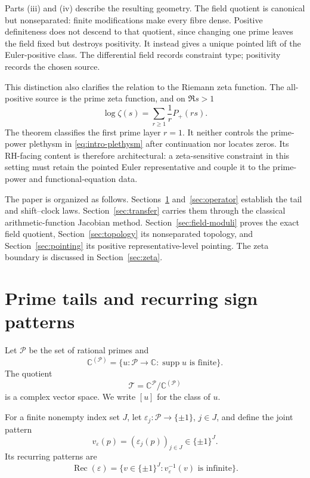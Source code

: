 \documentclass[11pt]{article}
\theoremstyle{definition}
\theoremstyle{remark}
\newcommand{\C}{\mathbb C}
\newcommand{\cP}{\mathcal P}
\newcommand{\cT}{\mathcal T}
\newcommand{\supp}{\operatorname{supp}}
\begin{document}
Parts (iii) and (iv) describe the resulting geometry.  The field quotient is canonical but
nonseparated: finite modifications make every fibre dense.  Positive definiteness does not descend
to that quotient, since changing one prime leaves the field fixed but destroys positivity.  It
instead gives a unique pointed lift of the Euler-positive class.  The differential field records
constraint type; positivity records the chosen source.

This distinction also clarifies the relation to the Riemann zeta function.  The all-positive
source is the prime zeta function, and on \(\Re s>1\)
\begin{equation}\label{eq:intro-plethysm}
  \log\zeta(s)=\sum_{r\geq1}\frac{1}{r}P_+(rs).
\end{equation}
The theorem classifies the first prime layer \(r=1\).  It neither controls the prime-power
plethysm in \eqref{eq:intro-plethysm} after continuation nor locates zeros.  Its RH-facing content
is therefore architectural: a zeta-sensitive constraint in this setting must retain the pointed
Euler representative and couple it to the prime-power and functional-equation data.

The paper is organized as follows.  Sections~\ref{sec:tail} and~\ref{sec:operator} establish the
tail and shift--clock laws.  Section~\ref{sec:transfer} carries them through the classical
arithmetic-function Jacobian method.  Section~\ref{sec:field-moduli} proves the exact field
quotient, Section~\ref{sec:topology} its nonseparated topology, and
Section~\ref{sec:pointing} its positive representative-level pointing.  The zeta boundary is
discussed in Section~\ref{sec:zeta}.

\section{Prime tails and recurring sign patterns}\label{sec:tail}

Let \(\cP\) be the set of rational primes and
\[
  \C^{(\cP)}
  =\{u:\cP\to\C:\supp u\text{ is finite}\}.
\]
The quotient
\begin{equation}\label{eq:tail-quotient}
  \cT=\C^{\cP}/\C^{(\cP)}
\end{equation}
is a complex vector space.  We write \([u]\) for the class of \(u\).

For a finite nonempty index set \(J\), let
\(\varepsilon_j:\cP\to\{\pm1\}\), \(j\in J\), and define the joint pattern
\[
  v_\varepsilon(p)=(\varepsilon_j(p))_{j\in J}\in\{\pm1\}^{J}.
\]
Its recurring patterns are
\begin{equation}\label{eq:recurring-patterns}
  \operatorname{Rec}(\varepsilon)
  =\{v\in\{\pm1\}^{J}:v_\varepsilon^{-1}(v)\text{ is infinite}\}.
\end{equation}
\end{document}

